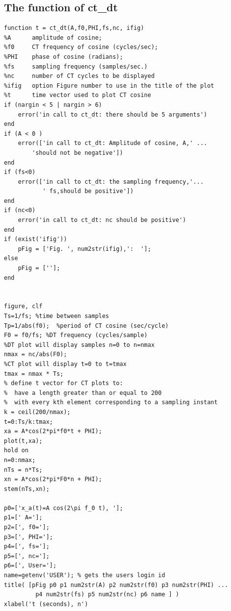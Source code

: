 \documentclass[12pt]{article}
\begin{document}
\subsection{The function of ct\_dt}
\begin{lstlisting}
function t = ct_dt(A,f0,PHI,fs,nc, ifig)
%A 	    amplitude of cosine;
%f0 	CT frequency of cosine (cycles/sec);
%PHI 	phase of cosine (radians);
%fs	    sampling frequency (samples/sec.)
%nc 	number of CT cycles to be displayed
%ifig   option Figure number to use in the title of the plot
%t      time vector used to plot CT cosine
if (nargin < 5 | nargin > 6)
    error('in call to ct_dt: there should be 5 arguments')
end
if (A < 0 )
    error(['in call to ct_dt: Amplitude of cosine, A,' ...
        'should not be negative'])
end
if (fs<0)
    error(['in call to ct_dt: the sampling frequency,'...
           ' fs,should be positive'])
end
if (nc<0)
    error('in call to ct_dt: nc should be positive')
end
if (exist('ifig'))
    pFig = ['Fig. ', num2str(ifig),':  '];
else
    pFig = [''];
end
    

figure, clf      
Ts=1/fs; %time between samples
Tp=1/abs(f0);  %period of CT cosine (sec/cycle)
F0 = f0/fs; %DT frequency (cycles/sample)
%DT plot will display samples n=0 to n=nmax
nmax = nc/abs(F0); 
%CT plot will display t=0 to t=tmax
tmax = nmax * Ts; 
% define t vector for CT plots to:
%  have a length greater than or equal to 200
%  with every kth element corresponding to a sampling instant
k = ceil(200/nmax);
t=0:Ts/k:tmax; 
xa = A*cos(2*pi*f0*t + PHI);
plot(t,xa);
hold on
n=0:nmax;
nTs = n*Ts;
xn = A*cos(2*pi*F0*n + PHI);
stem(nTs,xn);

p0=['x_a(t)=A cos(2\pi f_0 t), '];
p1=[' A='];
p2=[', f0='];
p3=[', PHI='];
p4=[', fs='];
p5=[', nc='];
p6=[', User='];
name=getenv('USER'); % gets the users login id
title( [pFig p0 p1 num2str(A) p2 num2str(f0) p3 num2str(PHI) ...
         p4 num2str(fs) p5 num2str(nc) p6 name ] )
xlabel('t (seconds), n')

\end{lstlisting}
\end{document}
